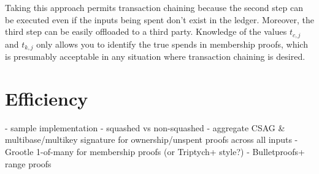 \begin{itemize}
    Taking this approach permits transaction chaining because the second step can be executed even if the inputs being spent don't exist in the ledger. Moreover, the third step can be easily offloaded to a third party. Knowledge of the values $t_{c,j}$ and $t_{k,j}$ only allows you to identify the true spends in membership proofs, which is presumably acceptable in any situation where transaction chaining is desired.
\end{itemize}



\section{Efficiency}
\label{sec:efficiency}

- sample implementation
    - squashed vs non-squashed
    - aggregate CSAG \& multibase/multikey signature for ownership/unspent proofs across all inputs
    - Grootle 1-of-many for membership proofs (or Triptych+ style?)
    - Bulletproofs+ range proofs
